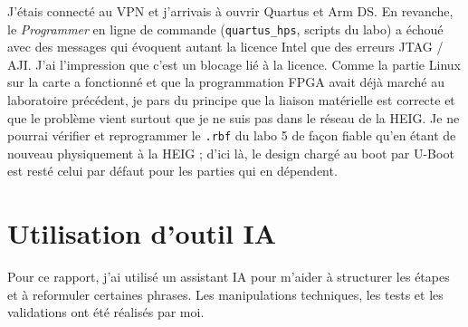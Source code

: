 \documentclass[a4paper,12pt]{article}
\begin{document}
J'étais connecté au VPN et j'arrivais à ouvrir Quartus et Arm DS. En revanche, le \emph{Programmer} en ligne de commande (\texttt{quartus\_hps}, scripts du labo) a échoué avec des messages qui évoquent autant la licence Intel que des erreurs JTAG / AJI. J'ai l'impression que c'est un blocage lié à la licence. Comme la partie Linux sur la carte a fonctionné et que la programmation FPGA avait déjà marché au laboratoire précédent, je pars du principe que la liaison matérielle est correcte et que le problème vient surtout que je ne suis pas dans le réseau de la HEIG. Je ne pourrai vérifier et reprogrammer le \texttt{.rbf} du labo 5 de façon fiable qu'en étant de nouveau physiquement à la HEIG ; d'ici là, le design chargé au boot par U-Boot est resté celui par défaut pour les parties qui en dépendent.

\newpage

\section{Utilisation d'outil IA}

Pour ce rapport, j'ai utilisé un assistant IA pour m'aider à structurer les étapes et à reformuler certaines phrases. Les manipulations techniques, les tests et les validations ont été réalisés par moi.
\end{document}

